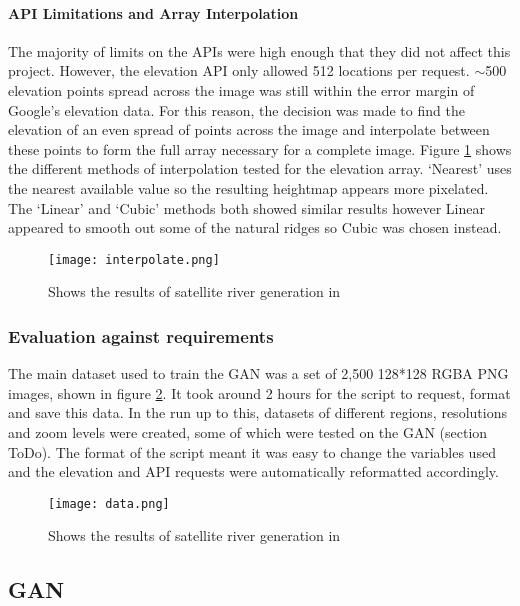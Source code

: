 \documentclass[a4paper]{report}
\begin{document}
\paragraph{API Limitations and Array Interpolation}
The majority of limits on the APIs were high enough that they did not affect this project. However, the elevation API only allowed 512 locations per request. $\sim$500 elevation points spread across the image was still within the error margin of Google's elevation data. For this reason, the decision was made to find the elevation of an even spread of points across the image and interpolate between these points to form the full array necessary for a complete image. Figure \ref{fig:interpolate} shows the different methods of interpolation tested for the elevation array. `Nearest' uses the nearest available value so the resulting heightmap appears more pixelated. The `Linear' and `Cubic' methods both showed similar results however Linear appeared to smooth out some of the natural ridges so Cubic was chosen instead.

\begin{figure}[H]
    \centering
        \texttt{[image: interpolate.png]}
        \caption{Shows the results of satellite river generation in}
        \label{fig:interpolate}
\end{figure}

\subsubsection{Evaluation against requirements}
The main dataset used to train the GAN was a set of 2,500 128*128 RGBA PNG images, shown in figure \ref{fig:data}. It took around 2 hours for the script to request, format and save this data. In the run up to this, datasets of different regions, resolutions and zoom levels were created, some of which were tested on the GAN (section ToDo). The format of the script meant it was easy to change the variables used and the elevation and API requests were automatically reformatted accordingly.

\begin{figure}[H]
    \centering
        \texttt{[image: data.png]}
        \caption{Shows the results of satellite river generation in}
        \label{fig:data}
\end{figure}

\subsection{GAN}
\end{document}
